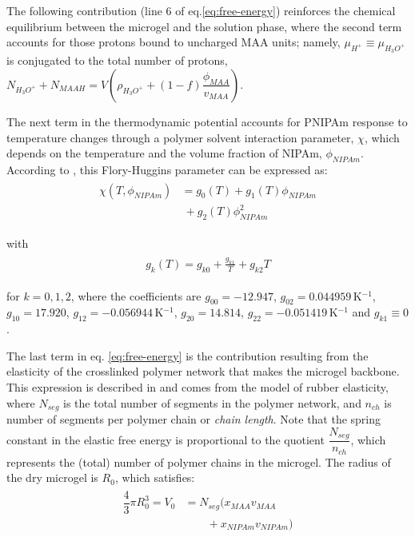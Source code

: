 The following contribution (line 6 of eq.\ref{eq:free-energy}) reinforces the chemical equilibrium between the microgel and the solution phase, where the second term accounts for those protons bound to uncharged MAA units; 
namely, $\mu_{H^+}\equiv\mu_{H_3O^+}$ is conjugated to the total number of protons,
$N_{H_3O^+}+N_{MAAH}=V\left(\rho_{H_3O^+}+(1-f)\dfrac{\phi_{MAA}}{v_{MAA}}\right)$.


The next term in the thermodynamic potential accounts for PNIPAm response to temperature changes through a polymer solvent interaction parameter, $\chi$, which depends on the temperature and the volume fraction of NIPAm, $\phi_{NIPAm}$.
According to \addcite[afroze2000], this Flory-Huggins parameter can be expressed as:
%
%
\begin{align}
\begin{aligned}
\chi (T, \phi_{NIPAm}) &=g_0(T) +g_1(T)\phi_{NIPAm} \\
 &~+ g_2(T)\phi_{NIPAm}^2
\end{aligned}
\end{align}

\noindent with
%
%
\begin{align}
\begin{aligned} 
g_k(T)=g_{k0} + \frac{g_{k1}}{T} + g_{k2}T
\end{aligned}
\end{align}


\noindent for $k=0,1,2$, where the coefficients are $g_{00}= -12.947$, $g_{02}=0.044959\,$K$^{-1}$, $g_{10}= 17.920$, $g_{12}= -0.056944$\,K$^{-1}$, $g_{20}= 14.814$, $g_{22}= -0.051419$\,K$^{-1}$ and $g_{k1}\equiv 0$ \addcite[afroze2000]. 


The last term in eq. \ref{eq:free-energy} is the contribution resulting from the elasticity of the crosslinked polymer network that makes the microgel backbone.
This expression is described in  and comes from the model of rubber elasticity, 
where $N_{seg}$ is the total number of segments in the polymer network, and $n_{ch}$ is number of segments per polymer chain or \emph{chain length}.
Note that the spring constant in the elastic free energy is proportional to the quotient $\dfrac{N_{seg}}{n_{ch}}$, which represents the (total) number of polymer chains in the microgel.
The radius of the dry microgel is $R_0$, which satisfies:
%
%
\begin{align}
\begin{aligned} 
\dfrac{4}{3}\pi R_0^3=V_0&=N_{seg}\Big( x_{MAA} v_{MAA}\\
&\qquad+x_{NIPAm} v_{NIPAm}\Big)
\end{aligned}
\end{align}

